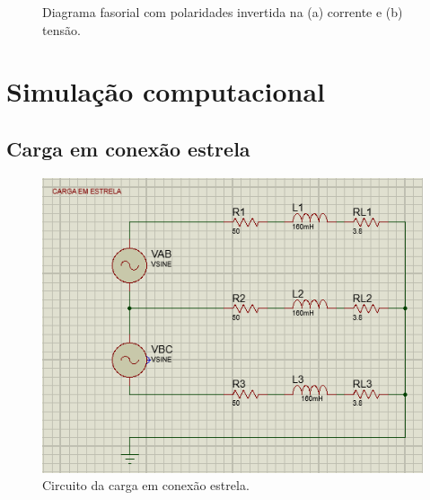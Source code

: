 \documentclass[a4paper,12pt,oneside,openany,table,xcdraw]{article}
\begin{document}
\begin{enumerate}[1)]
\begin{figure}[H]
\centering
{}\hfill
{}
\caption{Diagrama fasorial com polaridades invertida na (a) corrente e (b) tensão.}
\label{fasor:errado}
\end{figure}

\end{enumerate}

\newpage
\section{Simulação computacional} %
\subsection{Carga em conexão estrela}
\begin{figure}[H]
\centering
\includegraphics[width=14cm]{sim1}
\caption{Circuito da carga em conexão estrela.}
\label{sim1}
\end{figure}
\end{document}
